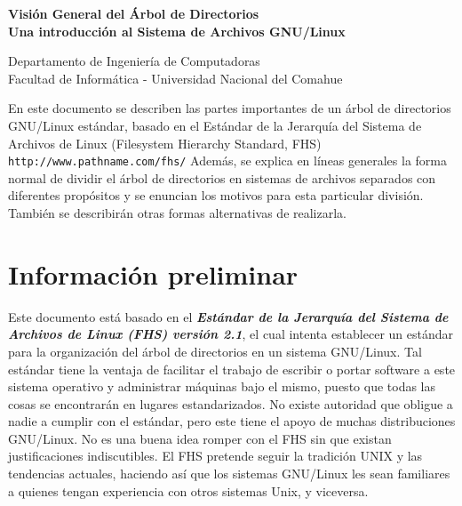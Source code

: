 ﻿
\usepackage{fancyhdr}
	\pagestyle{fancy}
\usepackage{lastpage}	
	\lhead{}
	\chead{}
	\rhead{}
	\cfoot{}
	\rfoot{\footnotesize \thepage\ }	%
	\renewcommand{\headrulewidth}{0.0pt}
	\renewcommand{\footrulewidth}{0.4pt}

\def\ti#1#2{\texttt{#1} & #2 \\ }





\setlength{\parindent}{0pt}


\makeatletter
{\color{bl} \centering \huge \sc \textbf{
Visión General del Árbol de Directorios \\
\large \vspace*{-8pt} \color{black} Una introducción al Sistema de Archivos GNU/Linux
\vspace*{8pt} }\par}
\makeatother


\makeatletter
{\centering \small 
	Departamento de Ingeniería de Computadoras \\
	Facultad de Informática - Universidad Nacional del Comahue \\
	\vspace{20pt} }
\makeatother



En este documento se describen las partes importantes de un árbol de
directorios GNU/Linux estándar, basado en el Estándar de la Jerarquía del
Sistema de Archivos de Linux (Filesystem Hierarchy Standard, FHS) \texttt{http://www.pathname.com/fhs/}
 Además, se
explica en líneas generales la forma normal de dividir el árbol de directorios
en  sistemas de archivos separados con diferentes propósitos y se enuncian los
motivos para esta particular división. También se describirán otras formas
alternativas de realizarla.  

\section{ Información preliminar}

Este documento está basado en el \textbf{\textit{Estándar de la Jerarquía del
Sistema de Archivos de Linux (FHS) versión 2.1}}, el cual intenta
establecer un estándar para la organización del árbol de directorios en un
sistema GNU/Linux. Tal estándar tiene la ventaja de facilitar el trabajo de
escribir o portar software a este sistema operativo y administrar máquinas bajo
el mismo, puesto que todas las cosas se encontrarán en lugares estandarizados.
No existe autoridad que obligue a nadie a cumplir con el estándar, pero este
tiene el apoyo de muchas distribuciones GNU/Linux. No es una buena idea romper
con el FHS sin que existan justificaciones indiscutibles. El FHS pretende seguir
la tradición UNIX y las tendencias actuales, haciendo así que los sistemas
GNU/Linux les sean familiares a quienes tengan experiencia con otros sistemas
Unix, y viceversa.  

